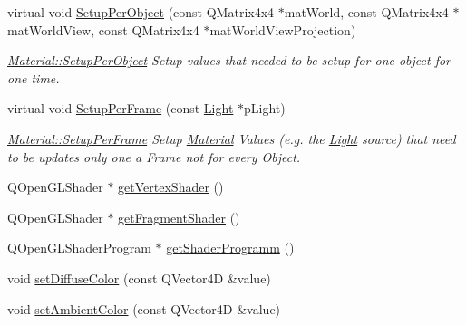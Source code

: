 \begin{DoxyCompactItemize}
virtual void \hyperlink{class_material_a3b2ab993eed57211d14f16f71efe6b75}{Setup\+Per\+Object} (const Q\+Matrix4x4 $\ast$mat\+World, const Q\+Matrix4x4 $\ast$mat\+World\+View, const Q\+Matrix4x4 $\ast$mat\+World\+View\+Projection)
\begin{DoxyCompactList}\small\item\em \hyperlink{class_material_a3b2ab993eed57211d14f16f71efe6b75}{Material\+::\+Setup\+Per\+Object} Setup values that needed to be setup for one object for one time. \end{DoxyCompactList}\item 
virtual void \hyperlink{class_material_a56025231f7fe57d5cf68fd21d2d425a1}{Setup\+Per\+Frame} (const \hyperlink{class_light}{Light} $\ast$p\+Light)
\begin{DoxyCompactList}\small\item\em \hyperlink{class_material_a56025231f7fe57d5cf68fd21d2d425a1}{Material\+::\+Setup\+Per\+Frame} Setup \hyperlink{class_material}{Material} Values (e.\+g. the \hyperlink{class_light}{Light} source) that need to be updates only one a Frame not for every Object. \end{DoxyCompactList}\item 
Q\+Open\+G\+L\+Shader $\ast$ \hyperlink{class_material_ad67cd89b791d35c26bdd8b9e4f486790}{get\+Vertex\+Shader} ()
\item 
Q\+Open\+G\+L\+Shader $\ast$ \hyperlink{class_material_a21f6b7cacf4e6fd64e3976951a296fb7}{get\+Fragment\+Shader} ()
\item 
Q\+Open\+G\+L\+Shader\+Program $\ast$ \hyperlink{class_material_a9ee8bb9a9370af4b0ab7790f5802c38a}{get\+Shader\+Programm} ()
\item 
void \hyperlink{class_material_a0abb21c533c69ea57fabc48d593db9af}{set\+Diffuse\+Color} (const Q\+Vector4\+D \&value)
\item 
void \hyperlink{class_material_a0c1cf0dcdd31f2a5ee6ccdef7a049216}{set\+Ambient\+Color} (const Q\+Vector4\+D \&value)
\end{DoxyCompactItemize}
